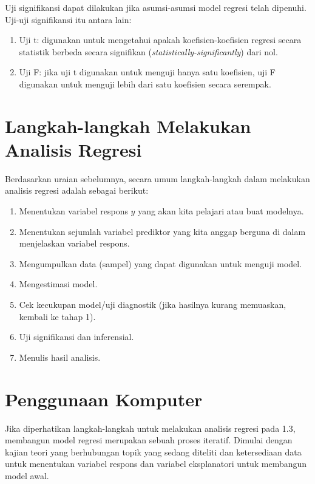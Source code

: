 \documentclass[
]{book}
\providecommand{\tightlist}{%
  \setlength{\itemsep}{0pt}\setlength{\parskip}{0pt}}
\begin{document}
Uji signifikansi dapat dilakukan jika asumsi-asumsi model regresi telah
dipenuhi. Uji-uji signifikansi itu antara lain:

\begin{enumerate}
\def\labelenumi{\arabic{enumi}.}
\item
  Uji t: digunakan untuk mengetahui apakah koefisien-koefisien regresi
  secara statistik berbeda secara signifikan
  (\emph{statistically-significantly}) dari nol.
\item
  Uji F: jika uji t digunakan untuk menguji hanya satu koefisien, uji
  F digunakan untuk menguji lebih dari satu koefisien secara serempak.
\end{enumerate}

\hypertarget{langkah-langkah-melakukan-analisis-regresi}{%
\section{Langkah-langkah Melakukan Analisis Regresi}\label{langkah-langkah-melakukan-analisis-regresi}}

Berdasarkan uraian sebelumnya, secara umum langkah-langkah dalam melakukan analisis regresi adalah sebagai berikut:

\begin{enumerate}
\def\labelenumi{\arabic{enumi}.}
\tightlist
\item
  Menentukan variabel respons \(y\) yang akan kita pelajari atau buat
  modelnya.
\item
  Menentukan sejumlah variabel prediktor yang kita anggap berguna di
  dalam menjelaskan variabel respons.
\item
  Mengumpulkan data (sampel) yang dapat digunakan untuk menguji model.
\item
  Mengestimasi model.
\item
  Cek kecukupan model/uji diagnostik (jika hasilnya kurang memuaskan,
  kembali ke tahap 1).
\item
  Uji signifikansi dan inferensial.
\item
  Menulis hasil analisis.
\end{enumerate}

\hypertarget{penggunaan-komputer}{%
\section{Penggunaan Komputer}\label{penggunaan-komputer}}

Jika diperhatikan langkah-langkah untuk melakukan analisis regresi pada
1.3, membangun model regresi merupakan sebuah proses iteratif. Dimulai
dengan kajian teori yang berhubungan topik yang sedang diteliti dan
ketersediaan data untuk menentukan variabel respons dan variabel
eksplanatori untuk membangun model awal.
\end{document}

